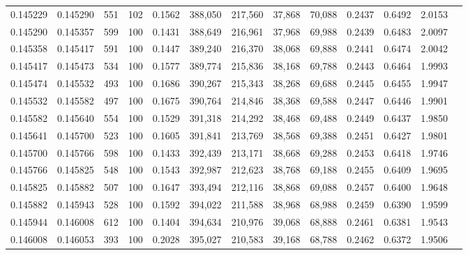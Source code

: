 \begin{tabular}{rrrrrrrrrrrrr}
0.145229 & 0.145290 &   551 & 102 &                                     0.1562 & 388,050 & 217,560 &  37,868 &  70,088 & 0.2437 & 0.6492 & 2.0153 \\
0.145290 & 0.145357 &   599 & 100 &                                     0.1431 & 388,649 & 216,961 &  37,968 &  69,988 & 0.2439 & 0.6483 & 2.0097 \\
0.145358 & 0.145417 &   591 & 100 &                                     0.1447 & 389,240 & 216,370 &  38,068 &  69,888 & 0.2441 & 0.6474 & 2.0042 \\
0.145417 & 0.145473 &   534 & 100 &                                     0.1577 & 389,774 & 215,836 &  38,168 &  69,788 & 0.2443 & 0.6464 & 1.9993 \\
0.145474 & 0.145532 &   493 & 100 &                                     0.1686 & 390,267 & 215,343 &  38,268 &  69,688 & 0.2445 & 0.6455 & 1.9947 \\
0.145532 & 0.145582 &   497 & 100 &                                     0.1675 & 390,764 & 214,846 &  38,368 &  69,588 & 0.2447 & 0.6446 & 1.9901 \\
0.145582 & 0.145640 &   554 & 100 &                                     0.1529 & 391,318 & 214,292 &  38,468 &  69,488 & 0.2449 & 0.6437 & 1.9850 \\
0.145641 & 0.145700 &   523 & 100 &                                     0.1605 & 391,841 & 213,769 &  38,568 &  69,388 & 0.2451 & 0.6427 & 1.9801 \\
0.145700 & 0.145766 &   598 & 100 &                                     0.1433 & 392,439 & 213,171 &  38,668 &  69,288 & 0.2453 & 0.6418 & 1.9746 \\
0.145766 & 0.145825 &   548 & 100 &                                     0.1543 & 392,987 & 212,623 &  38,768 &  69,188 & 0.2455 & 0.6409 & 1.9695 \\
0.145825 & 0.145882 &   507 & 100 &                                     0.1647 & 393,494 & 212,116 &  38,868 &  69,088 & 0.2457 & 0.6400 & 1.9648 \\
0.145882 & 0.145943 &   528 & 100 &                                     0.1592 & 394,022 & 211,588 &  38,968 &  68,988 & 0.2459 & 0.6390 & 1.9599 \\
0.145944 & 0.146008 &   612 & 100 &                                     0.1404 & 394,634 & 210,976 &  39,068 &  68,888 & 0.2461 & 0.6381 & 1.9543 \\
0.146008 & 0.146053 &   393 & 100 &                                     0.2028 & 395,027 & 210,583 &  39,168 &  68,788 & 0.2462 & 0.6372 & 1.9506 \\

\end{tabular}
